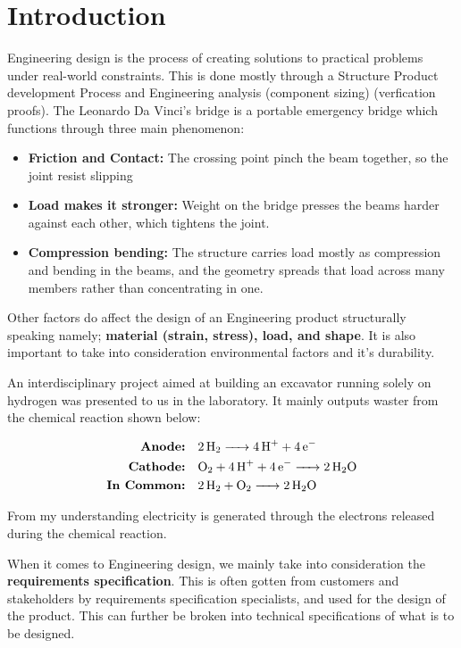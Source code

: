 \section{Introduction}
Engineering design is the process of creating solutions to practical problems under real-world
constraints. This is done mostly through a Structure Product development Process and Engineering
analysis (component sizing) (verfication proofs). The Leonardo Da Vinci's bridge is a portable
emergency bridge which functions through three main phenomenon:
\begin{itemize}
  \item  \textbf{Friction and Contact:} The crossing point pinch the beam together, so the joint
        resist slipping
  \item  \textbf{Load makes it stronger:} Weight on the bridge presses the beams harder against
        each other, which tightens the joint.
  \item  \textbf{Compression bending:} The structure carries load mostly as compression and
        bending in the beams, and the geometry spreads that load across many members rather than
        concentrating in one.
\end{itemize}

Other factors do affect the design of an Engineering product structurally speaking namely;
\textbf{material (strain, stress), load, and shape}. It is also important to take into
consideration environmental factors and it's durability.

An interdisciplinary project aimed at building an excavator running solely on hydrogen was
presented to us in the laboratory. It mainly outputs waster from the chemical reaction shown
below:

\begin{align*}
  \textbf{Anode:}     & \quad \ce{ 2H2 -> 4H+ + 4e-}       \\
  \textbf{Cathode:}   & \quad \ce {O2 + 4H+ + 4e- -> 2H2O} \\
  \textbf{In Common:} & \quad \ce{2H2 + O2 -> 2H2O}
\end{align*}

From my understanding electricity is generated through the electrons released during the
chemical reaction.

When it comes to Engineering design, we mainly take into consideration the
\textbf{requirements specification}. This is often gotten from customers and stakeholders by
requirements specification specialists, and used for the design of the product. This can
further  be broken into technical specifications of what is to be designed.
